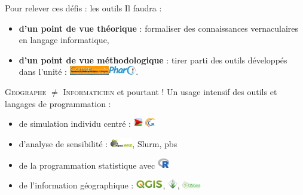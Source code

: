 \documentclass[newPxFont]{beamer}
\begin{document}
\begin{frame}{Pour relever ces défis : les outils}
	\vspace{-2em}
  Il faudra :
	\vspace{-1em}
	\begin{itemize}
		\item \textbf{d'un point de vue théorique} : formaliser des connaissances vernaculaires en langage informatique,
		\item \textbf{d'un point de vue méthodologique} : tirer parti des outils développés dans l'unité : \includegraphics[height=0.4cm]{img/logo_cormas}\includegraphics[height=0.4cm]{img/logo_pharo}.
	\end{itemize}
	\small{
		\begin{exampleblock}{\textsc{Geographe $\neq$ Informaticien} et pourtant !}
		Un usage intensif des outils et langages de programmation :
    \vspace{-1em}
			\begin{itemize}
				\item de simulation individu centré : \includegraphics[height=0.4cm]{img/netlogo_icon} \includegraphics[height=0.4cm]{img/logo_gama}
				\item d'analyse de sensibilité : \includegraphics[height=0.4cm]{img/logo_openmole}, Slurm, pbs
				\item de la programmation statistique avec \includegraphics[width=0.5cm]{img/Rlogo}
				\item de l'information géographique : \includegraphics[height=0.4cm]{img/logo_qgis}, \includegraphics[height=0.4cm]{img/logo_grass}, \includegraphics[width=0.8cm]{img/Logo_OSGeo}
			\end{itemize}
		\end{exampleblock}
	}
\end{frame}
\end{document}
